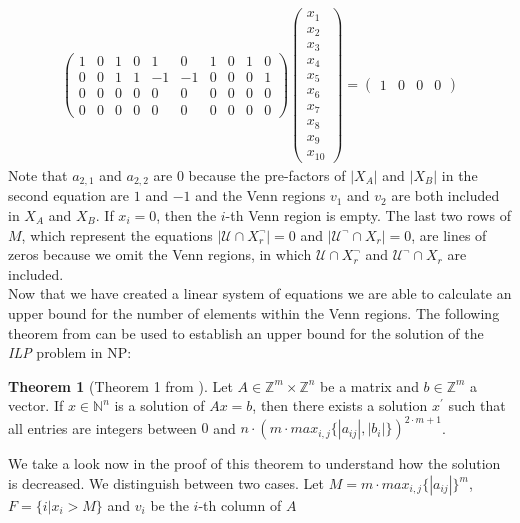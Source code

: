\documentclass{book}
\theoremstyle{break}
\theoremstyle{definition}
\newtheorem{mythe}{Theorem}
\begin{document}
\begin{align*}
\left ( \begin{array}{cccccccccc}
1&0&1&0&1&0&1&0&1&0\\
0&0&1&1&-1&-1&0&0&0&1\\
0&0&0&0&0&0&0&0&0&0\\
0&0&0&0&0&0&0&0&0&0
\end{array} \right )\left ( \begin{array}{c}
x_1\\x_2\\x_3\\x_4\\x_5\\x_6\\x_7\\x_8\\x_9\\x_{10}
\end{array}\right )=\left ( \begin{array}{cccc}
1&0&0&0
\end{array}\right )
\end{align*}
Note that $a_{2,1}$ and $a_{2,2}$ are $0$ because the pre-factors of $|X_A|$ and $|X_B|$ in the second equation are $1$ and $-1$ and the Venn regions $v_1$ and $v_2$ are both included in $X_A$ and $X_B$. If $x_i=0$, then the $i$-th Venn region is empty. The last two rows of $M$, which represent the equations $|\mathcal{U}\cap X^\neg_r|=0$ and $|\mathcal{U}^\neg\cap X_r|=0$, are lines of zeros because we omit the Venn regions, in which $\mathcal{U}\cap X_r^\neg$ and $\mathcal{U}^\neg\cap X_r$ are included.\\
Now that we have created a linear system of equations we are able to calculate an upper bound for the number of elements within the Venn regions. The following theorem from \cite{knapsack} can be used to establish an upper bound for the solution of the \textit{ILP} problem in NP:
\begin{mythe}[Theorem 1 from \cite{knapsack}]\label{upper bound}
Let $A\in \mathbb{Z}^m\times \mathbb{Z}^n$ be a matrix and $b\in\mathbb{Z}^m$ a vector. If $x\in\mathbb{N}^n$ is a solution of $Ax=b$, then there exists a solution $x^\prime$ such that all entries are integers between $0$ and $n\cdot (m\cdot max_{i,j}\{|a_{ij}|,|b_i|\})^{2\cdot m+1}$.
\end{mythe}
We take a look now in the proof of this theorem to understand how the solution is decreased. We distinguish between two cases. Let $M=m\cdot max_{i,j}\{|a_{ij}|\}^m$, $F=\{i|x_i>M\}$ and $v_i$ be the $i$-th column of $A$
\end{document}
